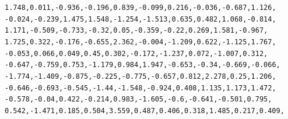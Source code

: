 \documentclass{report}\usepackage[]{graphicx}\usepackage[]{color}
\makeatletter
\newcommand{\hlnum}[1]{\textcolor[rgb]{0.686,0.059,0.569}{#1}}%
\newcommand{\hlopt}[1]{\textcolor[rgb]{0,0,0}{#1}}%
\newcommand{\hlstd}[1]{\textcolor[rgb]{0.345,0.345,0.345}{#1}}%
\newenvironment{kframe}{%
 \def\at@end@of@kframe{}%
 \ifinner\ifhmode%
  \def\at@end@of@kframe{\end{minipage}}%
  \begin{minipage}{\columnwidth}%
 \fi\fi%
 \def\FrameCommand##1{\hskip\@totalleftmargin \hskip-\fboxsep
 \colorbox{shadecolor}{##1}\hskip-\fboxsep
     \hskip-\linewidth \hskip-\@totalleftmargin \hskip\columnwidth}%
 \MakeFramed {\advance\hsize-\width
   \@totalleftmargin\z@ \linewidth\hsize
   \@setminipage}}%
 {\par\unskip\endMakeFramed%
 \at@end@of@kframe}
\newenvironment{knitrout}{}{} %
\makeatother
\begin{document}
\begin{knitrout}
\begin{kframe}
\begin{alltt}
    \hlnum{1.748}\hlstd{,} \hlnum{0.011}\hlstd{,} \hlopt{-}\hlnum{0.936}\hlstd{,} \hlopt{-}\hlnum{0.196}\hlstd{,} \hlnum{0.839}\hlstd{,} \hlopt{-}\hlnum{0.099}\hlstd{,} \hlnum{0.216}\hlstd{,} \hlopt{-}\hlnum{0.036}\hlstd{,} \hlopt{-}\hlnum{0.687}\hlstd{,} \hlnum{1.126}\hlstd{,}
    \hlopt{-}\hlnum{0.024}\hlstd{,} \hlopt{-}\hlnum{0.239}\hlstd{,} \hlnum{1.475}\hlstd{,} \hlnum{1.548}\hlstd{,} \hlopt{-}\hlnum{1.254}\hlstd{,} \hlopt{-}\hlnum{1.513}\hlstd{,} \hlnum{0.635}\hlstd{,} \hlnum{0.482}\hlstd{,} \hlnum{1.068}\hlstd{,} \hlopt{-}\hlnum{0.814}\hlstd{,}
    \hlnum{1.171}\hlstd{,} \hlopt{-}\hlnum{0.509}\hlstd{,} \hlopt{-}\hlnum{0.733}\hlstd{,} \hlopt{-}\hlnum{0.32}\hlstd{,} \hlnum{0.05}\hlstd{,} \hlopt{-}\hlnum{0.359}\hlstd{,} \hlopt{-}\hlnum{0.22}\hlstd{,} \hlnum{0.269}\hlstd{,} \hlnum{1.581}\hlstd{,} \hlopt{-}\hlnum{0.967}\hlstd{,}
    \hlnum{1.725}\hlstd{,} \hlnum{0.322}\hlstd{,} \hlopt{-}\hlnum{0.176}\hlstd{,} \hlopt{-}\hlnum{0.655}\hlstd{,} \hlnum{2.362}\hlstd{,} \hlopt{-}\hlnum{0.004}\hlstd{,} \hlopt{-}\hlnum{1.209}\hlstd{,} \hlnum{0.622}\hlstd{,} \hlopt{-}\hlnum{1.125}\hlstd{,} \hlnum{1.767}\hlstd{,}
    \hlopt{-}\hlnum{0.053}\hlstd{,} \hlnum{0.066}\hlstd{,} \hlnum{0.049}\hlstd{,} \hlnum{0.45}\hlstd{,} \hlnum{0.302}\hlstd{,} \hlopt{-}\hlnum{0.172}\hlstd{,} \hlopt{-}\hlnum{1.237}\hlstd{,} \hlnum{0.072}\hlstd{,} \hlopt{-}\hlnum{1.007}\hlstd{,} \hlnum{0.312}\hlstd{,}
    \hlopt{-}\hlnum{0.647}\hlstd{,} \hlopt{-}\hlnum{0.759}\hlstd{,} \hlnum{0.753}\hlstd{,} \hlopt{-}\hlnum{1.179}\hlstd{,} \hlnum{0.984}\hlstd{,} \hlnum{1.947}\hlstd{,} \hlopt{-}\hlnum{0.653}\hlstd{,} \hlopt{-}\hlnum{0.34}\hlstd{,} \hlopt{-}\hlnum{0.669}\hlstd{,} \hlopt{-}\hlnum{0.066}\hlstd{,}
    \hlopt{-}\hlnum{1.774}\hlstd{,} \hlopt{-}\hlnum{1.409}\hlstd{,} \hlopt{-}\hlnum{0.875}\hlstd{,} \hlopt{-}\hlnum{0.225}\hlstd{,} \hlopt{-}\hlnum{0.775}\hlstd{,} \hlopt{-}\hlnum{0.657}\hlstd{,} \hlnum{0.812}\hlstd{,} \hlnum{2.278}\hlstd{,} \hlnum{0.25}\hlstd{,} \hlnum{1.206}\hlstd{,}
    \hlopt{-}\hlnum{0.646}\hlstd{,} \hlopt{-}\hlnum{0.693}\hlstd{,} \hlopt{-}\hlnum{0.545}\hlstd{,} \hlopt{-}\hlnum{1.44}\hlstd{,} \hlopt{-}\hlnum{1.548}\hlstd{,} \hlopt{-}\hlnum{0.924}\hlstd{,} \hlnum{0.408}\hlstd{,} \hlnum{1.135}\hlstd{,} \hlnum{1.173}\hlstd{,} \hlnum{1.472}\hlstd{,}
    \hlopt{-}\hlnum{0.578}\hlstd{,} \hlopt{-}\hlnum{0.04}\hlstd{,} \hlnum{0.422}\hlstd{,} \hlopt{-}\hlnum{0.214}\hlstd{,} \hlnum{0.983}\hlstd{,} \hlopt{-}\hlnum{1.605}\hlstd{,} \hlopt{-}\hlnum{0.6}\hlstd{,} \hlopt{-}\hlnum{0.641}\hlstd{,} \hlopt{-}\hlnum{0.501}\hlstd{,} \hlnum{0.795}\hlstd{,}
    \hlnum{0.542}\hlstd{,} \hlopt{-}\hlnum{1.471}\hlstd{,} \hlnum{0.185}\hlstd{,} \hlnum{0.504}\hlstd{,} \hlnum{3.559}\hlstd{,} \hlnum{0.487}\hlstd{,} \hlnum{0.406}\hlstd{,} \hlnum{0.318}\hlstd{,} \hlnum{1.485}\hlstd{,} \hlnum{0.217}\hlstd{,} \hlnum{0.409}\hlstd{,}

\end{alltt}
\end{kframe}
\end{knitrout}
\end{document}
